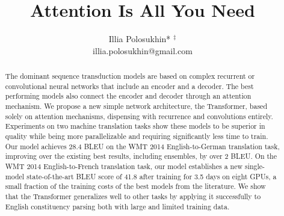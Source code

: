 \documentclass[10pt]{article}
\title{Attention Is All You Need }
\author{Illia Polosukhin* ${ }^{\ddagger}$\\
illia.polosukhin@gmail.com}
\date{}
\begin{document}
\maketitle


\begin{abstract}
The dominant sequence transduction models are based on complex recurrent or convolutional neural networks that include an encoder and a decoder. The best performing models also connect the encoder and decoder through an attention mechanism. We propose a new simple network architecture, the Transformer, based solely on attention mechanisms, dispensing with recurrence and convolutions entirely. Experiments on two machine translation tasks show these models to be superior in quality while being more parallelizable and requiring significantly less time to train. Our model achieves 28.4 BLEU on the WMT 2014 English-to-German translation task, improving over the existing best results, including ensembles, by over 2 BLEU. On the WMT 2014 English-to-French translation task, our model establishes a new single-model state-of-the-art BLEU score of 41.8 after training for 3.5 days on eight GPUs, a small fraction of the training costs of the best models from the literature. We show that the Transformer generalizes well to other tasks by applying it successfully to English constituency parsing both with large and limited training data.
\end{abstract}
\end{document}
